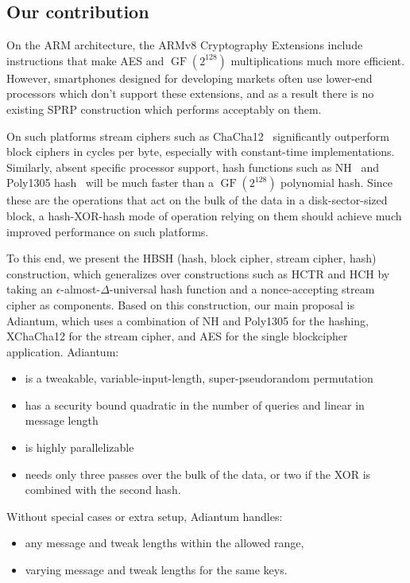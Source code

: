 \documentclass[journal=tosc,preprint,floatrow,submission]{iacrtrans}
\DeclareMathOperator{\GF}{GF}
\begin{document}
\subsection{Our contribution}
On the ARM architecture, the ARMv8 Cryptography Extensions include instructions that make
AES and $\GF(2^{128})$ multiplications much more efficient. However,
smartphones designed for developing markets
often use lower-end processors which
don't support these extensions, and as a result there is no existing SPRP construction which performs
acceptably on them.

On such platforms stream ciphers such as ChaCha12~\cite{chacha} significantly
outperform block ciphers in cycles per byte, especially with constant-time implementations.
Similarly, absent specific processor support, hash functions such as NH~\cite{umac2} and
Poly1305 hash~\cite{poly1305} will be much faster
than a $\GF(2^{128})$ polynomial hash. Since these are the operations that act on the bulk of
the data in a disk-sector-sized block, a hash-XOR-hash
mode of operation relying on them should achieve
much improved performance on such platforms.

To this end, we present the HBSH (hash, block cipher, stream cipher, hash)
construction, which generalizes over constructions such as
HCTR and HCH by taking an $\epsilon$-almost-$\Delta$-universal hash function and a
nonce-accepting stream cipher
as components. Based on this construction, our main proposal is Adiantum,
which uses a combination of NH and Poly1305 for the hashing, XChaCha12 for the stream cipher, and
AES for the single blockcipher application. Adiantum:
\begin{itemize}
    \item is a tweakable, variable-input-length, super-pseudorandom permutation
    \item has a security bound quadratic in the number of queries and linear in message length
    \item is highly parallelizable
    \item needs only three passes over the bulk of the data, or
        two if the XOR is combined with the second hash.
\end{itemize}

Without special cases or extra setup, Adiantum handles:
\begin{itemize}
    \item any message and tweak lengths within the allowed range,
    \item varying message and tweak lengths for the same keys.
\end{itemize}
\end{document}
